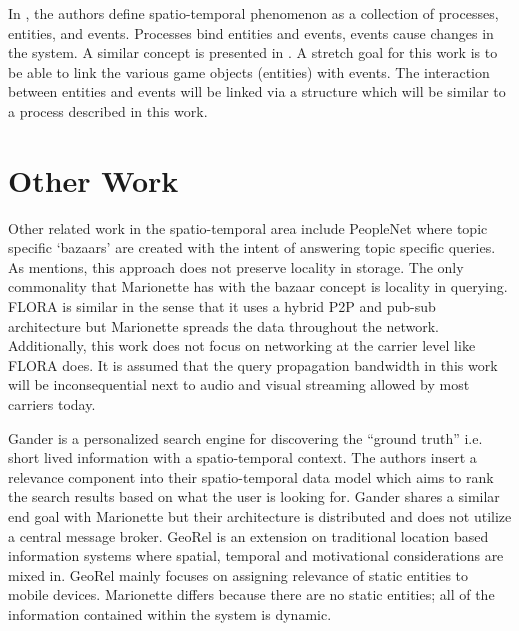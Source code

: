 \documentclass[12pt]{report}	%
\theoremstyle{definition}
\theoremstyle{remark}
\begin{document}
In \cite{wang2005event}, the authors define
spatio-temporal phenomenon as a collection of processes, entities, and
events. Processes bind entities and events, events cause changes in the
system. A similar concept is presented in
\cite{chen1998event}. A stretch goal for this work is
to be able to link the various game objects (entities) with events. The
interaction between entities and events will be linked via a structure
which will be similar to a process described in this work.

\section{Other Work}

Other related work in the spatio-temporal area include PeopleNet
\cite{motani2005peoplenet} where topic specific
`bazaars' are created with the intent of answering topic specific
queries. As \cite{zio2011p2p} mentions, this approach
does not preserve locality in storage. The only commonality that
Marionette has with the bazaar concept is locality in querying. FLORA
\cite{kokku2008enabling} is similar in the sense that
it uses a hybrid P2P and pub-sub architecture but Marionette spreads the
data throughout the network. Additionally, this work does not focus on
networking at the carrier level like FLORA does. It is assumed that the
query propagation bandwidth in this work will be inconsequential next to
audio and visual streaming allowed by most carriers today.

Gander \cite{michel2011gander} is a personalized search
engine for discovering the ``ground truth'' i.e. short lived information
with a spatio-temporal context. The authors insert a relevance component
into their spatio-temporal data model which aims to rank the search
results based on what the user is looking for. Gander shares a similar
end goal with Marionette but their architecture is distributed and does
not utilize a central message broker. GeoRel
\cite{reichenbacher2009geo} is an extension on
traditional location based information systems where spatial, temporal
and motivational considerations are mixed in. GeoRel mainly focuses on
assigning relevance of static entities to mobile devices. Marionette
differs because there are no static entities; all of the information
contained within the system is dynamic.
\end{document}
